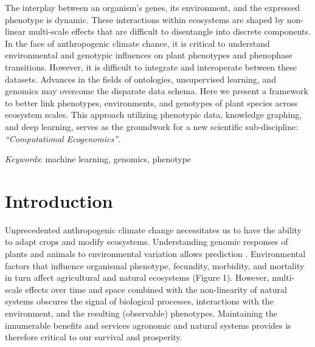 \documentclass[11pt,]{article}
\renewenvironment{abstract}
 {{%
    \setlength{\leftmargin}{0mm}
    \setlength{\rightmargin}{\leftmargin}%
  }%
  \relax}
 {\endlist}
\begin{document}
\begin{abstract}

    \hbox{\vrule height .2pt width 39.14pc}

    \vskip 8.5pt %

\noindent The interplay between an organism's genes, its environment, and the
expressed phenotype is dynamic. These interactions within ecosystems are
shaped by non-linear multi-scale effects that are difficult to
disentangle into discrete components. In the face of anthropogenic
climate chance, it is critical to understand environmental and genotypic
influences on plant phenotypes and phenophase transitions. However, it
is difficult to integrate and interoperate between these datasets.
Advances in the fields of ontologies, unsupervised learning, and
genomics may overcome the disparate data schema. Here we present a
framework to better link phenotypes, environments, and genotypes of
plant species across ecosystem scales. This approach utilizing
phenotypic data, knowledge graphing, and deep learning, serves as the
groundwork for a new scientific sub-discipline: \emph{``Computational
Ecogenomics''}.


\vskip 8.5pt \noindent \emph{Keywords}: machine learning, genomics, phenotype \par

    \hbox{\vrule height .2pt width 39.14pc}



\end{abstract}


\vskip -8.5pt



\noindent \doublespacing

\hypertarget{introduction}{%
\section{Introduction}\label{introduction}}

Unprecedented anthropogenic climate change necessitates us to have the
ability to adapt crops and modify ecosystems. Understanding genomic
responses of plants and animals to environmental variation allows
prediction \citep{ungerer2008ecological, des2013genotype}. Environmental
factors that influence organismal phenotype, fecundity, morbidity, and
mortality in turn affect agricultural and natural ecosystems (Figure 1).
However, multi-scale effects over time and space combined with the
non-linearity of natural systems
\citep{lorenz1963deterministic, ruel1999jensen, west2009general}
obscures the signal of biological processes, interactions with the
environment, and the resulting (observable) phenotypes. Maintaining the
innumerable benefits and services agronomic and natural systems provides
is therefore critical to our survival and prosperity.
\end{document}
